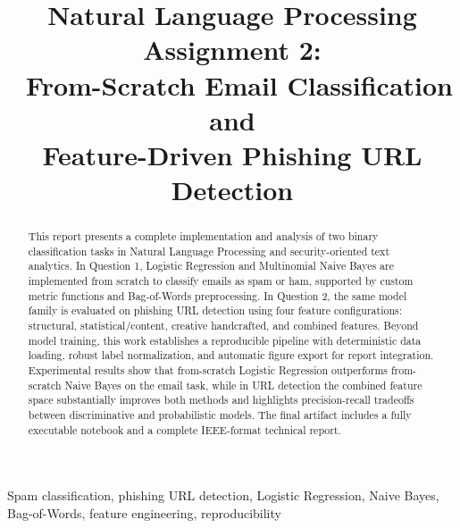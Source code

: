 \documentclass[conference]{IEEEtran}
\title{Natural Language Processing Assignment 2:\\\
From-Scratch Email Classification and\\
Feature-Driven Phishing URL Detection}
\author{\IEEEauthorblockN{Mohammad Mahdi Salmani Zarchi}
\IEEEauthorblockA{\textit{Department of Computer Engineering} \\
\textit{University of Tehran}\\
Student ID: 810100XXX \\
Email: m.salmani@ut.ac.ir}
}
\begin{document}
\maketitle

\begin{abstract}
This report presents a complete implementation and analysis of two binary classification tasks in Natural Language Processing and security-oriented text analytics. In Question 1, Logistic Regression and Multinomial Naive Bayes are implemented from scratch to classify emails as spam or ham, supported by custom metric functions and Bag-of-Words preprocessing. In Question 2, the same model family is evaluated on phishing URL detection using four feature configurations: structural, statistical/content, creative handcrafted, and combined features. Beyond model training, this work establishes a reproducible pipeline with deterministic data loading, robust label normalization, and automatic figure export for report integration. Experimental results show that from-scratch Logistic Regression outperforms from-scratch Naive Bayes on the email task, while in URL detection the combined feature space substantially improves both methods and highlights precision-recall tradeoffs between discriminative and probabilistic models. The final artifact includes a fully executable notebook and a complete IEEE-format technical report.
\end{abstract}

\begin{IEEEkeywords}
Spam classification, phishing URL detection, Logistic Regression, Naive Bayes, Bag-of-Words, feature engineering, reproducibility
\end{IEEEkeywords}










\clearpage







\end{document}
